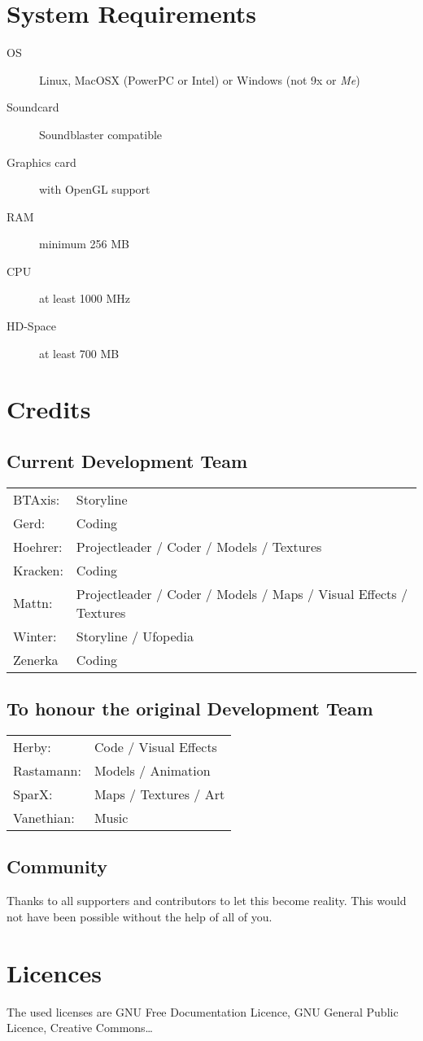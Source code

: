 \section{System Requirements}

\begin{description}
\item[OS] Linux, MacOSX (PowerPC or Intel) or Windows (not 9x or \emph{Me})
\item[Soundcard] Soundblaster compatible
\item[Graphics card] with OpenGL support
\item[RAM] minimum 256 MB
\item[CPU] at least 1000 MHz
\item[HD-Space] at least 700 MB
\end{description}

\section{Credits}

\subsection{Current Development Team}
\begin{tabular}{ll}
BTAxis:  	&	Storyline \\
Gerd:		&	Coding \\
Hoehrer:  	&	Projectleader / Coder / Models / Textures \\
Kracken:	&	Coding \\
Mattn:  	&	Projectleader / Coder / Models / Maps / Visual Effects / Textures \\
Winter:		&	Storyline / Ufopedia \\
Zenerka		&	Coding
\end{tabular} 

\subsection{To honour the original Development Team}
\begin{tabular}{ll}
Herby:  	&	Code / Visual Effects\\ 
Rastamann:	&	Models / Animation\\ 
SparX:  	&	Maps / Textures / Art\\ 
Vanethian:  &	Music\\ 
\end{tabular} 

\subsection{Community}
Thanks to all supporters and contributors to let this become reality. This would not have been possible without the help of all of you.

\section{Licences}
The used licenses are GNU Free Documentation Licence, GNU General Public Licence, Creative Commons\ldots
